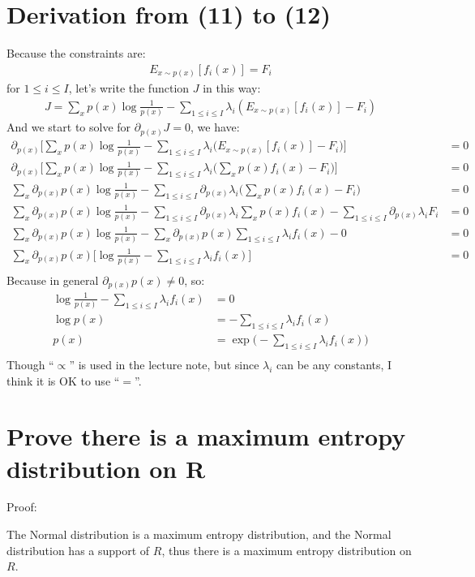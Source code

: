 \section{Derivation from (11) to (12)}
Because the constraints are:
\begin{align*}
    E_{x \sim p(x)}[f_i(x)] = F_i
\end{align*}
for $1 \leq i \leq I$, let's write the function $J$ in this way:
\begin{align*}
    J = \sum_x p(x) \log \frac{1}{p(x)} - \sum_{1 \leq i \leq I} \lambda_i (E_{x \sim p(x)}[f_i(x)]-F_i)
\end{align*}
And we start to solve for $\partial_{p(x)} J = 0$, we have:
\begin{align*}
    \partial_{p(x)} \biggr[ \sum_x p(x) \log \frac{1}{p(x)} - \sum_{1 \leq i \leq I} \lambda_i \biggr(E_{x \sim p(x)}[f_i(x)]-F_i\biggr) \biggr] &= 0 \\
    \partial_{p(x)} \biggr[ \sum_x p(x) \log \frac{1}{p(x)} - \sum_{1 \leq i \leq I} \lambda_i \biggr(\sum_{x} p(x) f_i(x)-F_i\biggr) \biggr] &= 0 \\
    \sum_x \partial_{p(x)} p(x) \log \frac{1}{p(x)} - \sum_{1 \leq i \leq I} \partial_{p(x)} \lambda_i \biggr(\sum_{x} p(x) f_i(x)-F_i\biggr) &= 0 \\
    \sum_x \partial_{p(x)} p(x) \log \frac{1}{p(x)} - \sum_{1 \leq i \leq I} \partial_{p(x)} \lambda_i \sum_{x} p(x) f_i(x) - \sum_{1 \leq i \leq I} \partial_{p(x)} \lambda_i F_i &= 0 \\
    \sum_x \partial_{p(x)} p(x) \log \frac{1}{p(x)} - \sum_x \partial_{p(x)} p(x) \sum_{1 \leq i \leq I} \lambda_i f_i(x) - 0 &= 0 \\
    \sum_x \partial_{p(x)} p(x) \biggr[ \log \frac{1}{p(x)} - \sum_{1 \leq i \leq I} \lambda_i f_i(x) \biggr] &= 0 \\
\end{align*}
Because in general $\partial_{p(x)} p(x) \neq 0$, so:
\begin{align*}
    \log \frac{1}{p(x)} - \sum_{1 \leq i \leq I} \lambda_i f_i(x) &= 0 \\
    \log p(x) &= - \sum_{1 \leq i \leq I} \lambda_i f_i(x)  \\
    p(x) &= \exp \biggr( - \sum_{1 \leq i \leq I} \lambda_i f_i(x) \biggr) \\
\end{align*}
Though ``$\propto$'' is used in the lecture note, but since $\lambda_i$ can be any constants, I think it is OK to use ``$=$''.

\section{Prove there is a maximum entropy distribution on R}
Proof:

The Normal distribution is a maximum entropy distribution, and the Normal distribution has a support of $R$,
thus there is a maximum entropy distribution on $R$.

